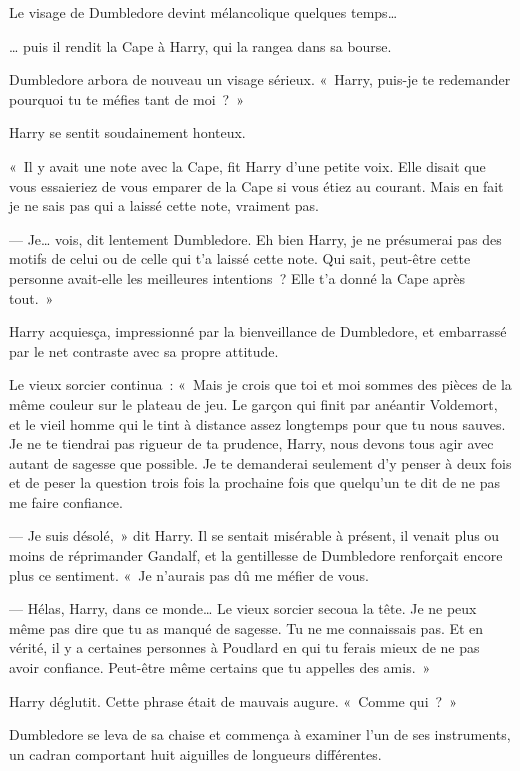 Le visage de Dumbledore devint mélancolique quelques temps…

… puis il rendit la Cape à Harry, qui la rangea dans sa bourse.

Dumbledore arbora de nouveau un visage sérieux.
«~Harry, puis-je te redemander pourquoi tu te méfies tant de moi~?~»

Harry se sentit soudainement honteux.

«~Il y avait une note avec la Cape, fit Harry d'une petite voix.
Elle disait que vous essaieriez de vous emparer de la Cape si vous étiez au courant.
Mais en fait je ne sais pas qui a laissé cette note, vraiment pas.

--- Je… vois, dit lentement Dumbledore.
Eh bien Harry, je ne présumerai pas des motifs de celui ou de celle qui t'a laissé cette note.
Qui sait, peut-être cette personne avait-elle les meilleures intentions~?
Elle t'a donné la Cape après tout.~»

Harry acquiesça, impressionné par la bienveillance de Dumbledore, et embarrassé par le net contraste avec sa propre attitude.

Le vieux sorcier continua~:
«~Mais je crois que toi et moi sommes des pièces de la même couleur sur le plateau de jeu.
Le garçon qui finit par anéantir Voldemort, et le vieil homme qui le tint à distance assez longtemps pour que tu nous sauves.
Je ne te tiendrai pas rigueur de ta prudence, Harry, nous devons tous agir avec autant de sagesse que possible.
Je te demanderai seulement d'y penser à deux fois et de peser la question trois fois la prochaine fois que quelqu'un te dit de ne pas me faire confiance.

--- Je suis désolé,~» dit Harry.
Il se sentait misérable à présent, il venait plus ou moins de réprimander Gandalf, et la gentillesse de Dumbledore renforçait encore plus ce sentiment.
«~Je n'aurais pas dû me méfier de vous.

--- Hélas, Harry, dans ce monde…
Le vieux sorcier secoua la tête.
Je ne peux même pas dire que tu as manqué de sagesse.
Tu ne me connaissais pas.
Et en vérité, il y a certaines personnes à Poudlard en qui tu ferais mieux de ne pas avoir confiance.
Peut-être même certains que tu appelles des amis.~»

Harry déglutit.
Cette phrase était de mauvais augure.
«~Comme qui~?~»

Dumbledore se leva de sa chaise et commença à examiner l'un de ses instruments, un cadran comportant huit aiguilles de longueurs différentes.

